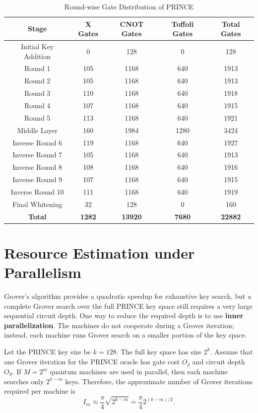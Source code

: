 \documentclass[12pt,a4paper]{report}
\begin{document}
\begin{table}[h]
\centering
\caption{Round-wise Gate Distribution of PRINCE}
\label{tab:round_gate_distribution}
\begin{tabular}{|c|c|c|c|c|}
\hline
\textbf{Stage} & \textbf{X Gates} & \textbf{CNOT Gates} & \textbf{Toffoli Gates} & \textbf{Total Gates} \\
\hline
Initial Key Addition & 0 & 128 & 0 & 128 \\
\hline
Round 1 & 105 & 1168 & 640 & 1913 \\
\hline
Round 2 & 105 & 1168 & 640 & 1913 \\
\hline
Round 3 & 110 & 1168 & 640 & 1918 \\
\hline
Round 4 & 107 & 1168 & 640 & 1915 \\
\hline
Round 5 & 113 & 1168 & 640 & 1921 \\
\hline
Middle Layer & 160 & 1984 & 1280 & 3424 \\
\hline
Inverse Round 6 & 119 & 1168 & 640 & 1927 \\
\hline
Inverse Round 7 & 105 & 1168 & 640 & 1913 \\
\hline
Inverse Round 8 & 108 & 1168 & 640 & 1916 \\
\hline
Inverse Round 9 & 107 & 1168 & 640 & 1915 \\
\hline
Inverse Round 10 & 111 & 1168 & 640 & 1919 \\
\hline
Final Whitening & 32 & 128 & 0 & 160 \\
\hline
\textbf{Total} & \textbf{1282} & \textbf{13920} & \textbf{7680} & \textbf{22882} \\
\hline
\end{tabular}
\end{table}

\section{Resource Estimation under Parallelism}

Grover's algorithm provides a quadratic speedup for exhaustive key search, but a complete Grover search over the full PRINCE key space still requires a very large sequential circuit depth. One way to reduce the required depth is to use \textbf{inner parallelization}. The machines do not cooperate during a Grover iteration; instead, each machine runs Grover search on a smaller portion of the key space.

Let the PRINCE key size be $k=128$. The full key space has size $2^k$. Assume that one Grover iteration for the PRINCE oracle has gate cost $O_g$ and circuit depth $O_d$. If $M=2^m$ quantum machines are used in parallel, then each machine searches only $2^{k-m}$ keys. Therefore, the approximate number of Grover iterations required per machine is
\[
I_m \approx \frac{\pi}{4}\sqrt{2^{k-m}}
      = \frac{\pi}{4}2^{(k-m)/2}.
\]
\end{document}
